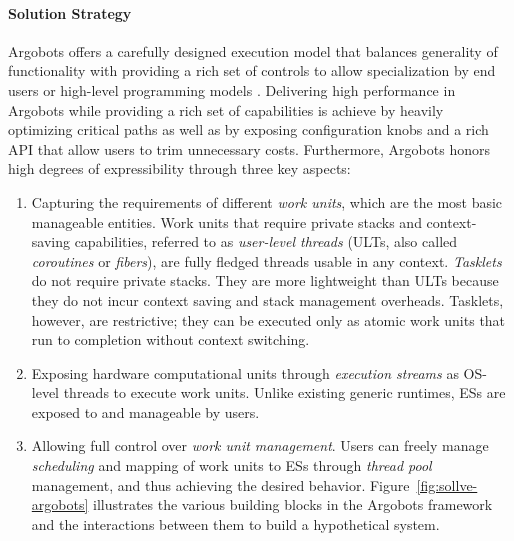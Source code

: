 \paragraph{Solution Strategy}

Argobots offers a carefully designed execution model that balances
generality of functionality with providing a rich set of controls to
allow specialization by end users or high-level programming models
\cite{seo2018}.  Delivering high performance in Argobots while
providing a rich set of capabilities is achieve by heavily optimizing
critical paths as well as by exposing configuration knobs and a rich
API that allow users to trim unnecessary costs. Furthermore, Argobots
honors high degrees of expressibility through three key aspects:

\begin{enumerate}

\item Capturing the requirements of different \emph{work units}, which
are the most basic manageable entities. Work units that require
private stacks and context-saving capabilities, referred to as
\textit{user-level threads} (ULTs, also called \textit{coroutines} or
\textit{fibers}), are fully fledged threads usable in any context.
\emph{Tasklets} do not require private stacks. They are more
lightweight than ULTs because they do not incur context saving and
stack management overheads.  Tasklets, however, are restrictive; they
can be executed only as atomic work units that run to completion
without context switching.

\item Exposing hardware computational units through \emph{execution
streams} as OS-level threads to execute work units. Unlike existing
generic runtimes, ESs are exposed to and manageable by users.

\item Allowing full control over \emph{work unit management}.  Users
can freely manage \emph{scheduling} and mapping of work units to ESs
through \emph{thread pool} management, and thus achieving the desired
behavior. Figure~\ref{fig:sollve-argobots} illustrates the various
building blocks in the Argobots framework and the interactions between
them to build a hypothetical system.

\end{enumerate}

